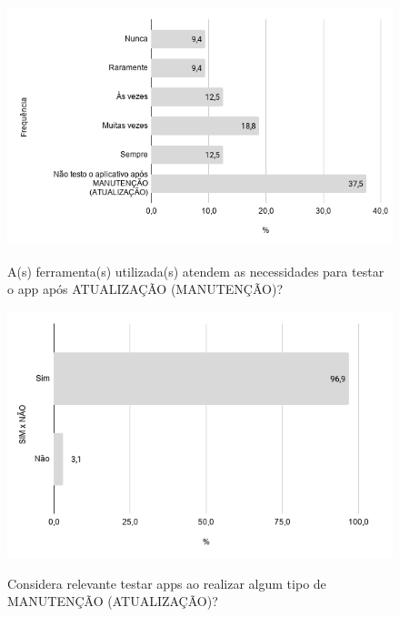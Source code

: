     
        \begin{figure}[!htb]
        \centering
        \includegraphics[width=.80\textwidth]{images/s_ferramentasexpectativas.png}
        \label{figure:s_ferramentasexpectativas}
        \caption{A(s) ferramenta(s) utilizada(s) atendem as necessidades para testar o app após ATUALIZAÇÃO (MANUTENÇÃO)?}
        \end{figure}
    
    
    
    
        \begin{figure}[!htb]
        \centering
        \includegraphics[width=.80\textwidth]{images/s_imptestarmanutencao.png}
        \label{figure:s_imptestarmanutencao}
        \caption{Considera relevante testar apps ao realizar algum tipo de MANUTENÇÃO (ATUALIZAÇÃO)?}
        \end{figure}
    
